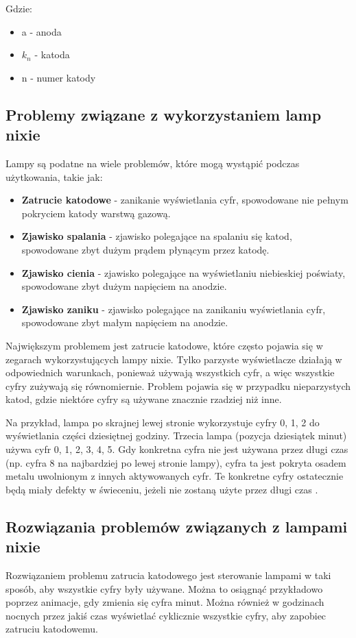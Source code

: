 \documentclass[../main.tex]{subfiles}
\begin{document}
Gdzie:
\begin{itemize}
  \item a - anoda
  \item $k_{n}$ - katoda
  \item n - numer katody
\end{itemize}
\subsection{Problemy związane z wykorzystaniem lamp nixie}

Lampy są podatne na wiele problemów, które mogą wystąpić podczas użytkowania, takie jak:
\begin{itemize}
  \item \textbf{Zatrucie katodowe} - zanikanie wyświetlania cyfr, spowodowane nie pełnym pokryciem katody warstwą gazową.
  \item \textbf{Zjawisko spalania} - zjawisko polegające na spalaniu się katod, spowodowane zbyt dużym prądem płynącym przez katodę.
  \item \textbf{Zjawisko cienia} - zjawisko polegające na wyświetlaniu niebieskiej poświaty, spowodowane zbyt dużym napięciem na anodzie.
  \item \textbf{Zjawisko zaniku} - zjawisko polegające na zanikaniu wyświetlania cyfr, spowodowane zbyt małym napięciem na anodzie.
\end{itemize}

Największym problemem jest zatrucie katodowe, które często pojawia się w zegarach wykorzystujących lampy nixie.
Tylko parzyste wyświetlacze działają w odpowiednich warunkach, ponieważ używają wszystkich cyfr, 
a więc wszystkie cyfry zużywają się równomiernie.
Problem pojawia się w przypadku nieparzystych katod, gdzie niektóre cyfry są używane znacznie rzadziej niż inne.

Na przykład, lampa po skrajnej lewej stronie wykorzystuje cyfry 0, 1, 2 do wyświetlania części dziesiętnej godziny.
Trzecia lampa (pozycja dziesiątek minut) używa cyfr 0, 1, 2, 3, 4, 5. Gdy konkretna cyfra nie jest używana przez długi czas
 (np. cyfra 8 na najbardziej po lewej stronie lampy),
cyfra ta jest pokryta osadem metalu uwolnionym z innych aktywowanych cyfr.
 Te konkretne cyfry ostatecznie będą miały defekty w świeceniu, jeżeli nie zostaną użyte przez długi czas \cite{st:nixie1}.

\subsection{Rozwiązania problemów związanych z lampami nixie}
Rozwiązaniem problemu zatrucia katodowego jest sterowanie lampami w taki sposób, aby wszystkie cyfry były używane.
Można to osiągnąć przykładowo poprzez animacje, gdy zmienia się cyfra minut.
Można również w godzinach nocnych przez jakiś czas wyświetlać cyklicznie wszystkie cyfry, aby zapobiec zatruciu katodowemu.
\end{document}
